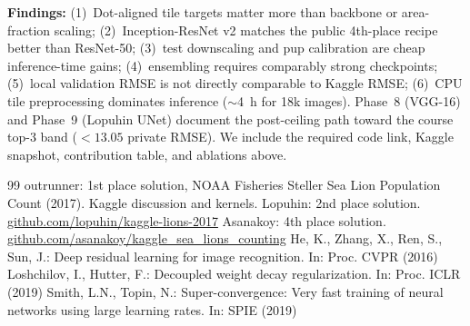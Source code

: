 \documentclass[12pt, a4paper]{article}
\begin{document}
\textbf{Findings:} (1)~Dot-aligned tile targets matter more than backbone or area-fraction scaling; (2)~Inception-ResNet v2 matches the public 4th-place recipe better than ResNet-50; (3)~test downscaling and pup calibration are cheap inference-time gains; (4)~ensembling requires comparably strong checkpoints; (5)~local validation RMSE is not directly comparable to Kaggle RMSE; (6)~CPU tile preprocessing dominates inference ($\sim$4~h for 18k images). Phase~8 (VGG-16) and Phase~9 (Lopuhin UNet) document the post-ceiling path toward the course top-3 band ($<13.05$ private RMSE). We include the required code link, Kaggle snapshot, contribution table, and ablations above.

\newpage
\begin{thebibliography}{99}
 outrunner: 1st place solution, NOAA Fisheries Steller Sea Lion Population Count (2017). Kaggle discussion and kernels.
 Lopuhin: 2nd place solution. \href{https://github.com/lopuhin/kaggle-lions-2017}{github.com/lopuhin/kaggle-lions-2017}
 Asanakoy: 4th place solution. \href{https://github.com/asanakoy/kaggle_sea_lions_counting}{github.com/asanakoy/kaggle\_sea\_lions\_counting}
 He, K., Zhang, X., Ren, S., Sun, J.: Deep residual learning for image recognition. In: Proc. CVPR (2016)
 Loshchilov, I., Hutter, F.: Decoupled weight decay regularization. In: Proc. ICLR (2019)
 Smith, L.N., Topin, N.: Super-convergence: Very fast training of neural networks using large learning rates. In: SPIE (2019)
\end{thebibliography}
\end{document}

